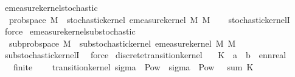 \begin{isabellebody}
\endisatagproof
{\isafoldproof}%
%
\isadelimproof
\isanewline
%
\endisadelimproof
\isanewline
{}\isamarkupfalse%
\ emeasure{\isacharunderscore}{\kern0pt}kernel{\isacharunderscore}{\kern0pt}stochastic{\isacharcolon}{\kern0pt}\isanewline
\ \ {\isachardoublequoteopen}prob{\isacharunderscore}{\kern0pt}space\ M{\isacharprime}{\kern0pt}\ {\isasymLongrightarrow}\ stochastic{\isacharunderscore}{\kern0pt}kernel\ {\isacharparenleft}{\kern0pt}emeasure{\isacharunderscore}{\kern0pt}kernel\ M\ M{\isacharprime}{\kern0pt}{\isacharparenright}{\kern0pt}{\isachardoublequoteclose}\isanewline
%
\isadelimproof
\ \ %
\endisadelimproof
%
\isatagproof
{}\isamarkupfalse%
\ stochastic{\isacharunderscore}{\kern0pt}kernelI\ \isamarkupfalse%
\ force%
\endisatagproof
{\isafoldproof}%
%
\isadelimproof
\isanewline
%
\endisadelimproof
\isanewline
{}\isamarkupfalse%
\ emeasure{\isacharunderscore}{\kern0pt}kernel{\isacharunderscore}{\kern0pt}substochastic{\isacharcolon}{\kern0pt}\isanewline
\ \ {\isachardoublequoteopen}subprob{\isacharunderscore}{\kern0pt}space\ M{\isacharprime}{\kern0pt}\ {\isasymLongrightarrow}\ substochastic{\isacharunderscore}{\kern0pt}kernel\ {\isacharparenleft}{\kern0pt}emeasure{\isacharunderscore}{\kern0pt}kernel\ M\ M{\isacharprime}{\kern0pt}{\isacharparenright}{\kern0pt}{\isachardoublequoteclose}\isanewline
%
\isadelimproof
\ \ %
\endisadelimproof
%
\isatagproof
{}\isamarkupfalse%
\ substochastic{\isacharunderscore}{\kern0pt}kernelI\ \isamarkupfalse%
\ force%
\endisatagproof
{\isafoldproof}%
%
\isadelimproof
\isanewline
%
\endisadelimproof
\isanewline
{}\isamarkupfalse%
\ discrete{\isacharunderscore}{\kern0pt}transition{\isacharunderscore}{\kern0pt}kernel{\isacharcolon}{\kern0pt}\isanewline
\ \ \ K\ {\isacharcolon}{\kern0pt}{\isacharcolon}{\kern0pt}\ {\isachardoublequoteopen}{\isacharprime}{\kern0pt}a\ {\isasymRightarrow}\ {\isacharprime}{\kern0pt}b\ {\isasymRightarrow}\ ennreal{\isachardoublequoteclose}\isanewline
\ \ \ {\isachardoublequoteopen}finite\ {\isasymOmega}\isanewline
\ \ \ {\isachardoublequoteopen}transition{\isacharunderscore}{\kern0pt}kernel\ {\isacharparenleft}{\kern0pt}sigma\ {\isasymOmega}\ {\isacharparenleft}{\kern0pt}Pow\ {\isasymOmega}\ {\isacharparenleft}{\kern0pt}sigma\ {\isasymOmega}\ {\isacharparenleft}{\kern0pt}Pow\ {\isasymOmega}\ {\isacharparenleft}{\kern0pt}{\isasymlambda}{\isasymomega}{\isachardot}{\kern0pt}\ sum\ {\isacharparenleft}{\kern0pt}K\ {\isasymomega}{\isacharparenright}{\kern0pt}{\isacharparenright}{\kern0pt}{\isachardoublequoteclose}\isanewline

\end{isabellebody}
